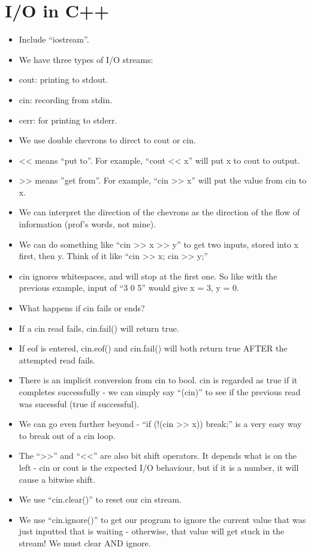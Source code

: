 \documentclass{article}
\begin{document}
\section{I/O in C++}
\begin{itemize}
\item Include ``iostream''.
\item We have three types of I/O streams:
\item cout: printing to stdout.
\item cin: recording from stdin.
\item cerr: for printing to stderr.
\item We use double chevrons to direct to cout or cin.
\item << means ``put to''.  For example, ``cout << x'' will put x to cout to output.
\item >> means ''get from''.  For example, ``cin >> x'' will put the value from cin to x.
\item We can interpret the direction of the chevrons as the direction of the flow of information (prof's words, not mine).
\item We can do something like ``cin >> x >> y'' to get two inputs, stored into x first, then y.  Think of it like ``cin >> x; cin >> y;''
\item cin ignores whitespaces, and will stop at the first one.  So like with the previous example, input of ``3 0 5'' would give x = 3, y = 0.
\item What happens if cin fails or ends?
\item If a cin read fails, cin.fail() will return true.
\item If eof is entered, cin.eof() and cin.fail() will both return true AFTER the attempted read fails.
\item There is an implicit conversion from cin to bool.  cin is regarded as true if it completes successfully - we can simply say ``(cin)'' to see if the previous read was sucessful (true if successful).
\item We can go even further beyond - ``if (!(cin >> x)) break;'' is a very easy way to break out of a cin loop.
\item The ``>>'' and ``<<'' are also bit shift operators.  It depends what is on the left - cin or cout is the expected I/O behaviour, but if it is a number, it will cause a bitwise shift.
\item We use ``cin.clear()'' to reset our cin stream.
\item We use ``cin.ignore()'' to get our program to ignore the current value that was just inputted that is waiting - otherwise, that value will get stuck in the stream!  We must clear AND ignore.
\end{itemize}
\end{document}
